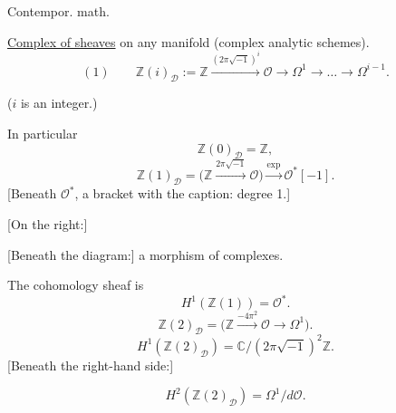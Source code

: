 Contempor. math. 

\underline{Complex of sheaves} on any manifold (complex analytic schemes).
\begin{equation*}
(1)\qquad
\mathbb Z(i)_{\mathcal D}:=
\mathbb Z\overset{(2\pi\sqrt{-1})^i}{\longrightarrow}
\mathcal O\longrightarrow\Omega^1\longrightarrow\ldots
\longrightarrow\Omega^{i-1}.
\end{equation*}

($i$ is an integer.)

In particular
\begin{equation*}
\mathbb Z(0)_{\mathcal D}=\mathbb Z,
\end{equation*}
\begin{equation*}
\mathbb Z(1)_{\mathcal D}=
\bigl(\mathbb Z\overset{2\pi\sqrt{-1}}{\longrightarrow}\mathcal O\bigr)
\overset{\exp}{\longrightarrow}\mathcal O^*[-1].
\end{equation*}
[Beneath $\mathcal O^*$, a bracket with the caption: degree 1.]

[On the right:]

[Beneath the diagram:] a morphism of complexes.

The cohomology sheaf is
\begin{equation*}
H^1(\mathbb Z(1))=\mathcal O^*.
\end{equation*}
\begin{equation*}
\mathbb Z(2)_{\mathcal D}=
\bigl(\mathbb Z\overset{-4\pi^2}{\longrightarrow}\mathcal O
\longrightarrow\Omega^1\bigr).
\end{equation*}
\begin{equation*}
H^1(\mathbb Z(2)_{\mathcal D})=
\mathbb C/(2\pi\sqrt{-1})^2\mathbb Z.
\end{equation*}
[Beneath the right-hand side:]

\begin{equation*}
H^2(\mathbb Z(2)_{\mathcal D})=\Omega^1/d\mathcal O.
\end{equation*}

